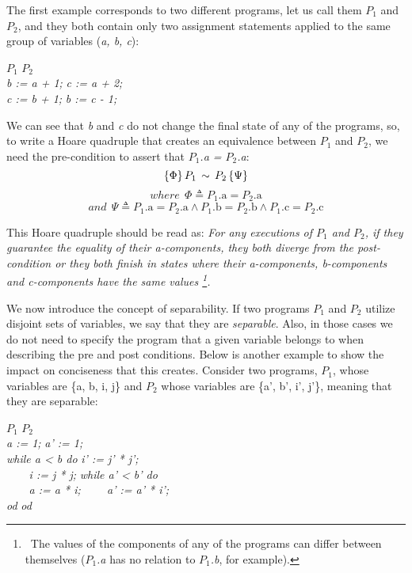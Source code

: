 The first example corresponds to two different programs, let us call them \emph{$P_1$} and \emph{$P_2$}, and they both contain only two assignment statements applied to the same group of variables (\emph{a, b, c}): 
\begin{tabbing}
  \hspace{2cm}\= \emph{$P_1$} \hspace{2cm} \= \emph{$P_2$} \\ 
  \> \emph{b := a + 1;} \> \emph{c := a + 2;} \\
  \> \emph{c := b + 1;} \> \emph{b := c - 1;}
  \label{tabbing:simple_equivalent_program}
\end{tabbing}

We can see that \emph{b} and \emph{c} do not change the final state of any of the programs, so, to write a Hoare quadruple that creates an equivalence between \emph{$P_1$} and \emph{$P_2$}, we need the pre-condition to assert that \emph{$P_1$.a = $P_2$.a}:
\[ \{ \Phi \} \, \emph{$P_1$} \, \sim \, \emph{$P_2$} \, \{ \Psi \} \]
\vspace{-20pt}
\[ where \ \ \Phi \triangleq \text{$P_1$.a} = \text{$P_2$.a} \]
\vspace{-25pt}
\[ and \ \ \Psi \triangleq \text{$P_1$.a} = \text{$P_2$.a} \land \text{$P_1$.b} = \text{$P_2$.b} \land \text{$P_1$.c} = \text{$P_2$.c} \]

This Hoare quadruple should be read as: \emph{For any executions of $P_1$ and $P_2$, if they guarantee the equality of their a-components, they both diverge from the post-condition or they both finish in states where their a-components, b-components and c-components have the same values
\protect\footnote{\ The values of the components of any of the programs can differ between themselves (\emph{$P_1$.a} has no relation to \emph{$P_1$.b}, for example).}.}

\iffalse considerando livres e ligadas? ou incorpora a conversao? \fi
We now introduce the concept of separability.
If two programs \emph{$P_1$} and \emph{$P_2$} utilize disjoint sets of variables, we say that they are \emph{separable}.
Also, in those cases we do not need to specify the program that a given variable belongs to when describing the pre and post conditions.
Below is another example to show the impact on conciseness that this creates.
Consider two programs, \emph{$P_1$}, whose variables are \{{a, b, i, j}\} and \emph{$P_2$} whose variables are \{{a', b', i', j'}\}, meaning that they are separable:
\begin{tabbing}
  \hspace{3cm}\= \emph{$P_1$} \hspace{3cm} \= \emph{$P_2$} \\ 
  \> \emph{a := 1;} \> \emph{a' := 1;} \\
  \> \emph{while a < b do} \> \emph{i' := j' * j';} \\
  \> \emph{\ \ \ \ i := j * j;} \> \emph{while a' < b' do} \\
  \> \emph{\ \ \ \ a := a * i;} \> \emph{\ \ \ \ a' := a' * i';} \\
  \> \emph{od} \> \emph{od} 
\end{tabbing}

